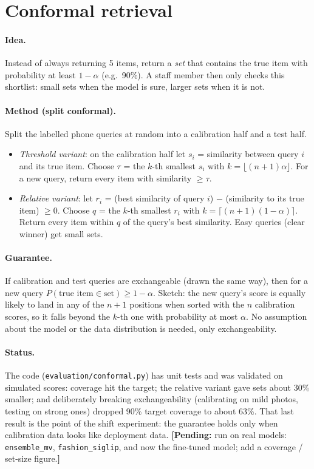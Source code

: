 \documentclass[11pt,a4paper]{article}
\newcommand{\pending}[1]{\textcolor{orange!80!black}{\textbf{[Pending:} #1\textbf{]}}}
\begin{document}
\section{Conformal retrieval}\label{sec:conformal}

\paragraph{Idea.} Instead of always returning 5 items, return a \emph{set} that contains the true item
with probability at least $1-\alpha$ (e.g.\ 90\%). A staff member then only checks this shortlist:
small sets when the model is sure, larger sets when it is not.

\paragraph{Method (split conformal).} Split the labelled phone queries at random into a calibration
half and a test half.
\begin{itemize}
  \item \emph{Threshold variant}: on the calibration half let $s_i$ = similarity between query $i$
        and its true item. Choose $\tau$ = the $k$-th smallest $s_i$ with
        $k=\lfloor (n+1)\alpha \rfloor$. For a new query, return every item with similarity
        $\ge \tau$.
  \item \emph{Relative variant}: let $r_i$ = (best similarity of query $i$) $-$ (similarity to its true
        item) $\ge 0$. Choose $q$ = the $k$-th smallest $r_i$ with $k=\lceil (n+1)(1-\alpha)\rceil$.
        Return every item within $q$ of the query's best similarity. Easy queries (clear winner) get
        small sets.
\end{itemize}

\paragraph{Guarantee.} If calibration and test queries are exchangeable (drawn the same way), then for a
new query $P(\text{true item} \in \text{set}) \ge 1-\alpha$. Sketch: the new query's score is equally
likely to land in any of the $n+1$ positions when sorted with the $n$ calibration scores, so it falls
beyond the $k$-th one with probability at most $\alpha$. No assumption about the model or the data
distribution is needed, only exchangeability.

\paragraph{Status.} The code (\texttt{evaluation/conformal.py}) has unit tests and was validated on
simulated scores: coverage hit the target; the relative variant gave sets about 30\% smaller; and
deliberately breaking exchangeability (calibrating on mild photos, testing on strong ones) dropped
90\% target coverage to about 63\%. That last result is the point of the shift experiment: the
guarantee holds only when calibration data looks like deployment data.
\pending{run on real models: \texttt{ensemble\_mv}, \texttt{fashion\_siglip}, and now the fine-tuned
model; add a coverage / set-size figure.}
\end{document}
